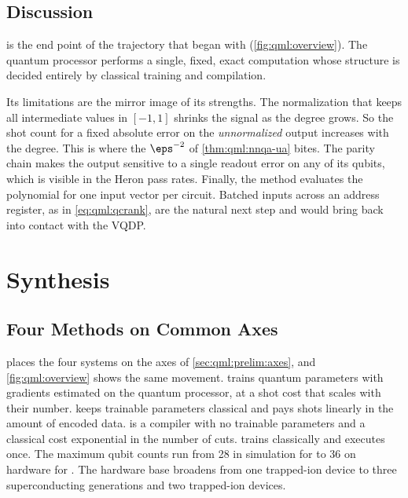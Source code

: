 \subsection{Discussion}\label{sec:qml:nnqa:discussion}

\nnqa{} is the end point of the trajectory that began with \qpie{} (\cref{fig:qml:overview}). The quantum processor performs a single, fixed, exact computation whose structure is decided entirely by classical training and compilation.

Its limitations are the mirror image of its strengths. The normalization that keeps all intermediate values in $[-1,1]$ shrinks the signal as the degree grows. So the shot count for a fixed absolute error on the \emph{unnormalized} output increases with the degree. This is where the $\eps^{-2}$ of \cref{thm:qml:nnqa-ua} bites. The parity chain makes the output sensitive to a single readout error on any of its qubits, which is visible in the Heron pass rates. Finally, the method evaluates the polynomial for one input vector per circuit. Batched inputs across an address register, as in \cref{eq:qml:qcrank}, are the natural next step and would bring \nnqa{} back into contact with the VQDP.

\section{Synthesis}\label{sec:qml:synthesis}

\subsection{Four Methods on Common Axes}\label{sec:qml:synthesis:axes}

 places the four systems on the axes of \cref{sec:qml:prelim:axes}, and \cref{fig:qml:overview} shows the same movement. \qpie{} trains quantum parameters with gradients estimated on the quantum processor, at a shot cost that scales with their number. \vqt{} keeps trainable parameters classical and pays shots linearly in the amount of encoded data. \shardq{} is a compiler with no trainable parameters and a classical cost exponential in the number of cuts. \nnqa{} trains classically and executes once. The maximum qubit counts run from 28 in simulation for \qpie{} to 36 on hardware for \nnqa{}. The hardware base broadens from one trapped-ion device to three superconducting generations and two trapped-ion devices.

